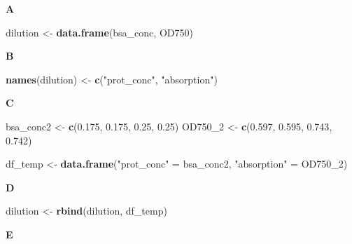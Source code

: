 \documentclass[]{book}
\newenvironment{Shaded}{\begin{snugshade}}{\end{snugshade}}
\newcommand{\DecValTok}[1]{\textcolor[rgb]{0.00,0.00,0.81}{#1}}
\newcommand{\FloatTok}[1]{\textcolor[rgb]{0.00,0.00,0.81}{#1}}
\newcommand{\KeywordTok}[1]{\textcolor[rgb]{0.13,0.29,0.53}{\textbf{#1}}}
\newcommand{\NormalTok}[1]{#1}
\newcommand{\StringTok}[1]{\textcolor[rgb]{0.31,0.60,0.02}{#1}}
\begin{document}
\textbf{A}

\begin{Shaded}
\begin{Highlighting}[]
\NormalTok{dilution <-}\StringTok{ }\KeywordTok{data.frame}\NormalTok{(bsa_conc, OD750)}
\end{Highlighting}
\end{Shaded}

\textbf{B}

\begin{Shaded}
\begin{Highlighting}[]
\KeywordTok{names}\NormalTok{(dilution) <-}\StringTok{ }\KeywordTok{c}\NormalTok{(}\StringTok{"prot_conc"}\NormalTok{, }\StringTok{"absorption"}\NormalTok{)}
\end{Highlighting}
\end{Shaded}

\textbf{C}

\begin{Shaded}
\begin{Highlighting}[]
\NormalTok{bsa_conc2 <-}\StringTok{ }\KeywordTok{c}\NormalTok{(}\FloatTok{0.175}\NormalTok{,   }\FloatTok{0.175}\NormalTok{,  }\FloatTok{0.25}\NormalTok{,   }\FloatTok{0.25}\NormalTok{)}
\NormalTok{OD750_}\DecValTok{2}\NormalTok{ <-}\StringTok{ }\KeywordTok{c}\NormalTok{(}\FloatTok{0.597}\NormalTok{, }\FloatTok{0.595}\NormalTok{,  }\FloatTok{0.743}\NormalTok{,  }\FloatTok{0.742}\NormalTok{)}
\end{Highlighting}
\end{Shaded}

\begin{Shaded}
\begin{Highlighting}[]
\NormalTok{df_temp <-}\StringTok{ }\KeywordTok{data.frame}\NormalTok{(}\StringTok{"prot_conc"}\NormalTok{ =}\StringTok{ }\NormalTok{bsa_conc2,}
                      \StringTok{"absorption"}\NormalTok{ =}\StringTok{ }\NormalTok{OD750_}\DecValTok{2}\NormalTok{)}
\end{Highlighting}
\end{Shaded}

\textbf{D}

\begin{Shaded}
\begin{Highlighting}[]
\NormalTok{dilution <-}\StringTok{ }\KeywordTok{rbind}\NormalTok{(dilution, df_temp)}
\end{Highlighting}
\end{Shaded}

\textbf{E}
\end{document}
